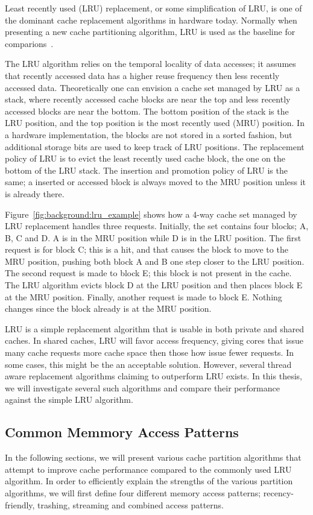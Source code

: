Least recently used (LRU) replacement, or some simplification of LRU, is one of the dominant cache replacement algorithms in hardware today. 
Normally when presenting a new cache partitioning algorithm, LRU is used as the baseline for comparions~\cite{Jaleel2010,Qureshi2006,Qureshi2007}.

The LRU algorithm relies on the temporal locality of data accesses; it assumes that recently accessed data has a higher reuse frequency then less recently accessed data.
Theoretically one can envision a cache set managed by LRU as a stack, where recently accessed cache blocks are near the top and less recently accessed blocks are near the bottom.
The bottom position of the stack is the LRU position, and the top position is the most recently used (MRU) position.
In a hardware implementation, the blocks are not stored in a sorted fashion, but additional storage bits are used to keep track of LRU positions.
The replacement policy of LRU is to evict the least recently used cache block, the one on the bottom of the LRU stack.
The insertion and promotion policy of LRU is the same; a inserted or accessed block is always moved to the MRU position unless it is already there.

Figure~\ref{fig:background:lru_example} shows how a 4-way cache set managed by LRU replacement handles three requests. 
Initially, the set contains four blocks; A, B, C and D. 
A is in the MRU position while D is in the LRU position.
The first request is for block C; this is a hit, and that causes the block to move to the MRU position, pushing both block A and B one step closer to the LRU position.
The second request is made to block E; this block is not present in the cache.
The LRU algorithm evicts block D at the LRU position and then places block E at the MRU position.
Finally, another request is made to block E. Nothing changes since the block already is at the MRU position.

LRU is a simple replacement algorithm that is usable in both private and shared caches.
In shared caches, LRU will favor access frequency, giving cores that issue many cache requests more cache space then those how issue fewer requests. 
In some cases, this might be the an acceptable solution. 
However, several thread aware replacement algorithms claiming to outperform LRU exists. 
In this thesis, we will investigate several such algorithms and compare their performance against the simple LRU algorithm.



\subsection{Common Memmory Access Patterns}
In the following sections, we will present various cache partition algorithms that attempt to improve cache performance compared to the commonly used LRU algorithm.
In order to efficiently explain the strengths of the various partition algorithms, we will first define four different memory access patterns; recency-friendly, trashing, streaming and combined access patterns.

